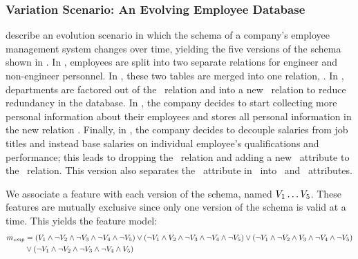 \subsubsection{Variation Scenario: An Evolving Employee Database}
\label{sec:emp-scenario}



\citet{prima08Moon} describe an evolution scenario in which the schema of a
company's employee management system changes over time, yielding the five
versions of the schema shown in .
%
In \vOne, employees are split into two separate relations for
engineer and non-engineer personnel.
%
In \vTwo, these two tables are merged into one relation, \empacct.
%
In \vThree, departments are factored out of the \empacct\ relation and
into a new \dept\ relation to reduce redundancy in the database.
%
In \vFour, the company decides to start collecting more personal
information about their employees and stores all personal information in the
new relation \empbio.
%
Finally, in \vFive, the company decides to decouple salaries from
job titles and instead base salaries on individual employee's qualifications
and performance; this leads to dropping the \job\ relation and adding a new
\salary\ attribute to the \empacct\ relation. This version also separates the
\name\ attribute in \empbio\ into \fname\ and \lname\ attributes.


We associate a feature with each version of the schema, named 
$\vOne\ldots\vFive$.
%
These features are mutually exclusive since only one version of the
schema is valid at a time. This yields the  feature model:
%
%
\begin{align*}
\fModel_\employee
  &=   \left(\vOne\wedge\neg\vTwo\wedge\neg\vThree\wedge\neg\vFour\wedge\neg\vFive\right)
\vee\left(\neg\vOne\wedge\vTwo\wedge\neg\vThree\wedge\neg\vFour\wedge\neg\vFive\right)
  \vee\left(\neg\vOne\wedge\neg\vTwo\wedge\vThree\wedge\neg\vFour\wedge\neg\vFive\right)\\
   &
  \vee\left(\neg\vOne\wedge\neg\vTwo\wedge\neg\vThree\wedge\neg\vFour\wedge\vFive\right)
\end{align*}


